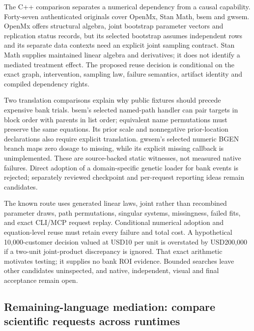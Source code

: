 The C++ comparison separates a numerical dependency from a causal
capability. Forty-seven authenticated originals cover OpenMx, Stan Math,
bsem and gwsem. OpenMx offers structural algebra, joint bootstrap
parameter vectors and replication status records, but its selected
bootstrap assumes independent rows and its separate data contexts need
an explicit joint sampling contract. Stan Math supplies maintained
linear algebra and derivatives; it does not identify a mediated
treatment effect. The proposed reuse decision is conditional on the
exact graph, intervention, sampling law, failure semantics, artifact
identity and compiled dependency rights.
\citep{exec25_cmed_openmx,exec25_cmed_stanmath}

Two translation comparisons explain why public fixtures should precede
expensive bank trials. bsem's selected named-path handler can pair
targets in block order with parents in list order; equivalent name
permutations must preserve the same equations. Its prior scale and
nonnegative prior-location declarations also require explicit
translation. gwsem's selected numeric BGEN branch maps zero dosage to
missing, while its explicit missing callback is unimplemented. These are
source-backed static witnesses, not measured native failures. Direct
adoption of a domain-specific genetic loader for bank events is
rejected; separately reviewed checkpoint and per-request reporting ideas
remain candidates. \citep{exec25_cmed_bsem,exec25_cmed_gwsem}

The known route uses generated linear laws, joint rather than recombined
parameter draws, path permutations, singular systems, missingness,
failed fits, and exact CLI/MCP request replay. Conditional numerical
adoption and equation-level reuse must retain every failure and total
cost. A hypothetical 10,000-customer decision valued at USD10 per unit
is overstated by USD200,000 if a two-unit joint-product discrepancy is
ignored. That exact arithmetic motivates testing; it supplies no bank
ROI evidence. Bounded searches leave other candidates uninspected, and
native, independent, visual and final acceptance remain open.
\citep{exec25_cmed_choice}

\hypertarget{remaining-language-mediation-compare-scientific-requests-across-runtimes}{%
\subsection{Remaining-language mediation: compare scientific requests
across
runtimes}\label{remaining-language-mediation-compare-scientific-requests-across-runtimes}}

